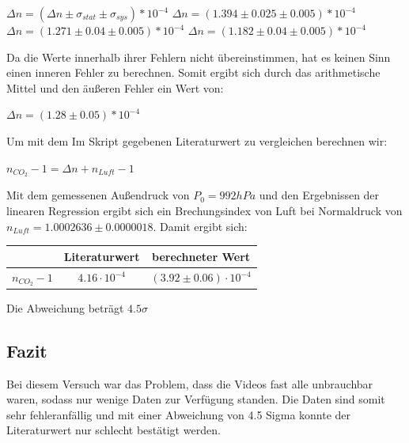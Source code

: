\documentclass[a4paper, 11pt]{article}
\begin{document}
\begin{center}
$\Delta n=(\Delta n \pm \sigma_{stat} \pm \sigma_{sys}  )*10^{-4}$\newline
$\Delta n=(1.394 \pm 0.025 \pm 0.005  )*10^{-4}$\newline
$\Delta n=(1.271 \pm 0.04 \pm 0.005 )*10^{-4}$\newline
$\Delta n=(1.182 \pm 0.04 \pm 0.005 )*10^{-4}$\newline
\end{center}
Da die Werte innerhalb ihrer Fehlern nicht übereinstimmen, hat es keinen Sinn einen inneren Fehler zu berechnen. Somit ergibt sich durch das arithmetische Mittel und den äußeren Fehler ein Wert von:
\begin{center}
$\Delta n=(1.28 \pm 0.05)*10^{-4}$\newline
\end{center}
Um mit dem Im Skript gegebenen Literaturwert zu vergleichen berechnen wir:
\begin{center}
$n_{CO_2}-1=\Delta n+n_{Luft}-1$
\end{center}
Mit dem gemessenen Außendruck von $ P_0=992hPa$ und den Ergebnissen der linearen Regression ergibt sich ein Brechungsindex von Luft bei Normaldruck von $n_{Luft}=1.0002636 \pm 0.0000018$.
Damit ergibt sich:
\begin{center}
\begin{tabular}{|c|c|c|}
\hline $ $&Literaturwert& berechneter Wert\\
\hline $n_{CO_2}-1$& $4.16\cdot 10^{-4}$ & $(3.92\pm0.06)\cdot 10^{-4}$\\
\hline
\end{tabular}

\end{center}
Die Abweichung beträgt $4.5 \sigma$

\subsection{Fazit}
Bei diesem Versuch war das Problem, dass die Videos fast alle unbrauchbar waren, sodass nur wenige Daten zur Verfügung standen. Die Daten sind somit sehr fehleranfällig und mit einer Abweichung von 4.5 Sigma konnte der Literaturwert nur schlecht bestätigt werden.


\newpage
\listoffigures
\listoftables
\end{document}
